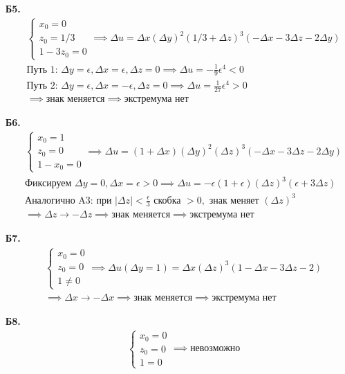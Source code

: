 \documentclass[12pt]{article}
\begin{document}
\noindent \textbf{Б5.}
\begin{align*}
&\begin{cases} x_0 = 0 \\ z_0 = 1/3 \\ 1 - 3z_0 = 0 \end{cases} \implies \Delta u = \Delta x(\Delta y)^2(1/3+\Delta z)^3(-\Delta x - 3\Delta z - 2\Delta y) \\
&\text{Путь 1: } \Delta y = \epsilon, \Delta x = \epsilon, \Delta z = 0 \implies \Delta u = -\frac{1}{9}\epsilon^4 < 0 \\
&\text{Путь 2: } \Delta y = \epsilon, \Delta x = -\epsilon, \Delta z = 0 \implies \Delta u = \frac{1}{27}\epsilon^4 > 0 \\
&\implies \text{знак меняется} \implies \text{экстремума нет}
\end{align*}

\noindent \textbf{Б6.}
\begin{align*}
&\begin{cases} x_0 = 1 \\ z_0 = 0 \\ 1 - x_0 = 0 \end{cases} \implies \Delta u = (1+\Delta x)(\Delta y)^2(\Delta z)^3(-\Delta x - 3\Delta z - 2\Delta y) \\
&\text{Фиксируем } \Delta y = 0, \Delta x = \epsilon > 0 \implies \Delta u = -\epsilon(1+\epsilon)(\Delta z)^3(\epsilon + 3\Delta z) \\
&\text{Аналогично A3: при } |\Delta z| < \frac{\epsilon}{3} \text{ скобка } > 0, \text{ знак меняет } (\Delta z)^3 \\
&\implies \Delta z \to -\Delta z \implies \text{знак меняется} \implies \text{экстремума нет}
\end{align*}

\noindent \textbf{Б7.}
\begin{align*}
&\begin{cases} x_0 = 0 \\ z_0 = 0 \\ 1 \neq 0 \end{cases} \implies \Delta u(\Delta y=1) = \Delta x(\Delta z)^3(1-\Delta x-3\Delta z-2) \\
&\implies \Delta x \to -\Delta x \implies \text{знак меняется} \implies \text{экстремума нет}
\end{align*}

\noindent \textbf{Б8.}
\begin{align*}
&\begin{cases} x_0 = 0 \\ z_0 = 0 \\ 1 = 0 \end{cases} \implies \text{невозможно}
\end{align*}
\end{document}
